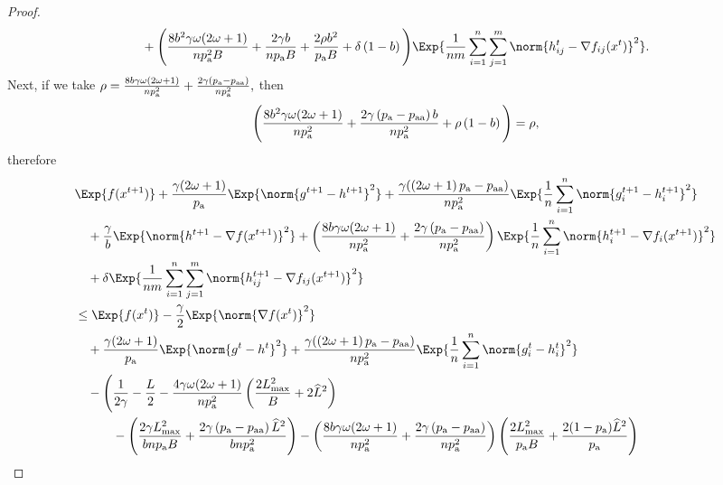 \documentclass{article}
\newcommand*{\probavailable}{\ensuremath{p_{\textnormal{a}}}}
\newcommand*{\probpairaa}{\ensuremath{p_{\textnormal{aa}}}}
\begin{document}
\begin{proof}
\begin{align*}
      &\quad + \Bigg(\frac{8 b^2 \gamma \omega (2 \omega + 1)}{n \probavailable^2 B} + \frac{2 \gamma b}{n \probavailable B} + \frac{2 \rho b^2}{\probavailable B} + \delta \left(1 - b\right)\Bigg)\Exp{\frac{1}{nm}\sum_{i=1}^n\sum_{j=1}^m\norm{h^{t}_{ij} - \nabla f_{ij}(x^{t})}^2}.
    \end{align*}
    Next, if we take $\rho = \frac{8 b \gamma \omega (2 \omega + 1)}{n \probavailable^2} + \frac{2 \gamma \left(\probavailable - \probpairaa\right)}{n \probavailable^2},$ then
    $$\Bigg(\frac{8 b^2 \gamma \omega (2 \omega + 1)}{n \probavailable^2} + \frac{2 \gamma \left(\probavailable - \probpairaa\right) b}{n \probavailable^2} + \rho \left(1 - b\right)\Bigg) = \rho,$$ therefore
    \begin{align*}
      &\Exp{f(x^{t + 1})} + \frac{\gamma (2 \omega + 1)}{\probavailable} \Exp{\norm{g^{t+1} - h^{t+1}}^2} + \frac{\gamma (\left(2 \omega + 1\right)\probavailable - \probpairaa)}{n \probavailable^2} \Exp{\frac{1}{n}\sum_{i=1}^n\norm{g^{t+1}_i - h^{t+1}_i}^2}\\
      &\quad  + \frac{\gamma}{b} \Exp{\norm{h^{t+1} - \nabla f(x^{t+1})}^2} + \left(\frac{8 b \gamma \omega (2 \omega + 1)}{n \probavailable^2} + \frac{2 \gamma \left(\probavailable - \probpairaa\right)}{n \probavailable^2}\right) \Exp{\frac{1}{n}\sum_{i=1}^n\norm{h^{t+1}_i - \nabla f_i(x^{t+1})}^2}\\
      &\quad + \delta \Exp{\frac{1}{nm}\sum_{i=1}^n\sum_{j=1}^m\norm{h^{t+1}_{ij} - \nabla f_{ij}(x^{t+1})}^2} \\
      &\leq \Exp{f(x^t)} - \frac{\gamma}{2}\Exp{\norm{\nabla f(x^t)}^2} \\
      &\quad + \frac{\gamma (2 \omega + 1)}{\probavailable} \Exp{\norm{g^{t} - h^{t}}^2} + \frac{\gamma (\left(2 \omega + 1\right)\probavailable - \probpairaa)}{n \probavailable^2} \Exp{\frac{1}{n}\sum_{i=1}^n\norm{g^{t}_i - h^{t}_i}^2} \\
      &\quad - \Bigg(\frac{1}{2\gamma} - \frac{L}{2} - \frac{4 \gamma \omega (2 \omega + 1)}{n \probavailable^2} \left(\frac{2 L_{\max}^2}{B} + 2 \widehat{L}^2\right) \\
      &\qquad\quad - \left(\frac{2 \gamma L_{\max}^2}{b n \probavailable B} + \frac{2 \gamma \left(\probavailable - \probpairaa\right) \widehat{L}^2}{b n \probavailable^2}\right) - \left(\frac{8 b \gamma \omega (2 \omega + 1)}{n \probavailable^2} + \frac{2 \gamma \left(\probavailable - \probpairaa\right)}{n \probavailable^2}\right) \left(\frac{2 L_{\max}^2}{\probavailable B} +\frac{2(1 - \probavailable) \widehat{L}^2}{\probavailable}\right) \\

\end{align*}
\end{proof}
\end{document}
